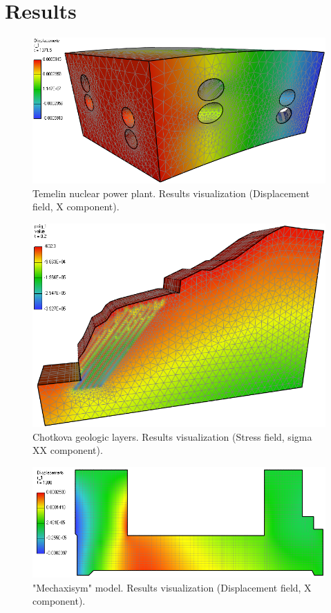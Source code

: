\section{Results}
\label{section:results}

\begin{figure}[ht]
\centering\includegraphics[width=\textwidth]{figures/temelin_screenshot}
\caption{Temelin nuclear power plant. Results visualization (Displacement field, X component).}
\label{fig:temelin:mesh}
\end{figure}

\begin{figure}[ht]
\centering\includegraphics[width=\textwidth]{figures/chotkova_screenshot}
\caption{Chotkova geologic layers. Results visualization (Stress field, sigma XX component).}
\label{fig:chotkova:mesh}
\end{figure}

\begin{figure}[ht]
\centering\includegraphics[width=\textwidth]{figures/mechaxisym_screenshot}
\caption{"Mechaxisym" model. Results visualization (Displacement field, X component).}
\label{fig:mechaxisym:mesh}
\end{figure}

